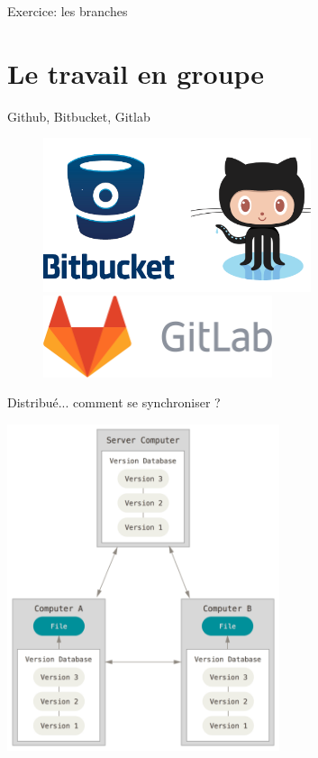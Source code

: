 \documentclass{beamer}
\begin{document}
\begin{frame}{Exercice: les branches}

\end{frame}

\section{Le travail en groupe}

\begin{frame}{Github, Bitbucket, Gitlab}
\begin{figure}
    \centering
    \includegraphics[width=0.7\textwidth]{img/github-bitbucket.png} \\
    \includegraphics[width=0.6\textwidth]{img/gitlab.png}
\end{figure}
\end{frame}

\begin{frame}{Distribué... comment se synchroniser ?}
    \begin{center}
        \includegraphics[width=0.6\textwidth]{img/distributed.png}
    \end{center}
\end{frame}
\end{document}
